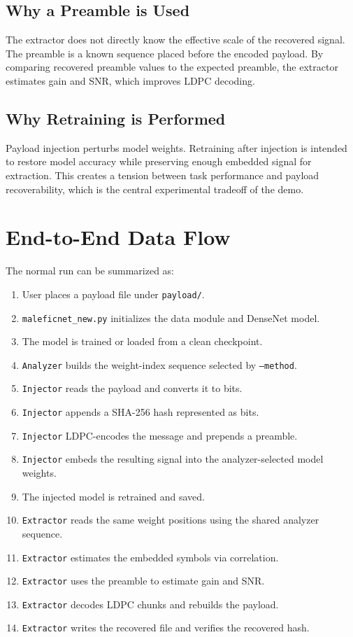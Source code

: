 \documentclass[11pt,a4paper]{article}
\newcommand{\code}[1]{\texttt{#1}}
\begin{document}
\subsection{Why a Preamble is Used}

The extractor does not directly know the effective scale of the recovered signal. The preamble is a known sequence placed before the encoded payload. By comparing recovered preamble values to the expected preamble, the extractor estimates gain and SNR, which improves LDPC decoding.

\subsection{Why Retraining is Performed}

Payload injection perturbs model weights. Retraining after injection is intended to restore model accuracy while preserving enough embedded signal for extraction. This creates a tension between task performance and payload recoverability, which is the central experimental tradeoff of the demo.

\section{End-to-End Data Flow}

The normal run can be summarized as:

\begin{enumerate}[leftmargin=1.6em]
  \item User places a payload file under \code{payload/}.
  \item \code{maleficnet\_new.py} initializes the data module and DenseNet model.
  \item The model is trained or loaded from a clean checkpoint.
  \item \code{Analyzer} builds the weight-index sequence selected by \code{--method}.
  \item \code{Injector} reads the payload and converts it to bits.
  \item \code{Injector} appends a SHA-256 hash represented as bits.
  \item \code{Injector} LDPC-encodes the message and prepends a preamble.
  \item \code{Injector} embeds the resulting signal into the analyzer-selected model weights.
  \item The injected model is retrained and saved.
  \item \code{Extractor} reads the same weight positions using the shared analyzer sequence.
  \item \code{Extractor} estimates the embedded symbols via correlation.
  \item \code{Extractor} uses the preamble to estimate gain and SNR.
  \item \code{Extractor} decodes LDPC chunks and rebuilds the payload.
  \item \code{Extractor} writes the recovered file and verifies the recovered hash.
\end{enumerate}
\end{document}
